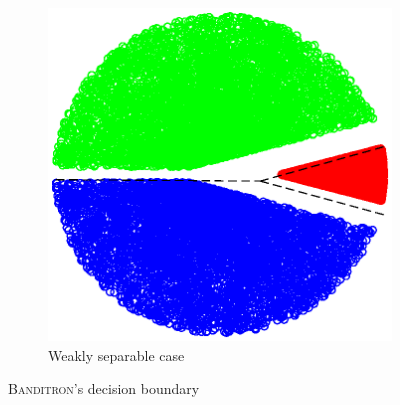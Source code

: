 \begin{figure}[h!]
\begin{subfigure}[b]{0.23\textwidth}
        \hspace*{-0.3cm}  \includegraphics[width=1.15\textwidth, trim={0, 0cm, 0, 0}, clip]{figures/weak_banditron_points}
         \caption{Weakly separable case}
    \end{subfigure}
    \vspace*{-0.2cm}
    \caption{\textsc{Banditron}'s decision boundary}
     \label{fig:banditron-points}
\end{figure}

